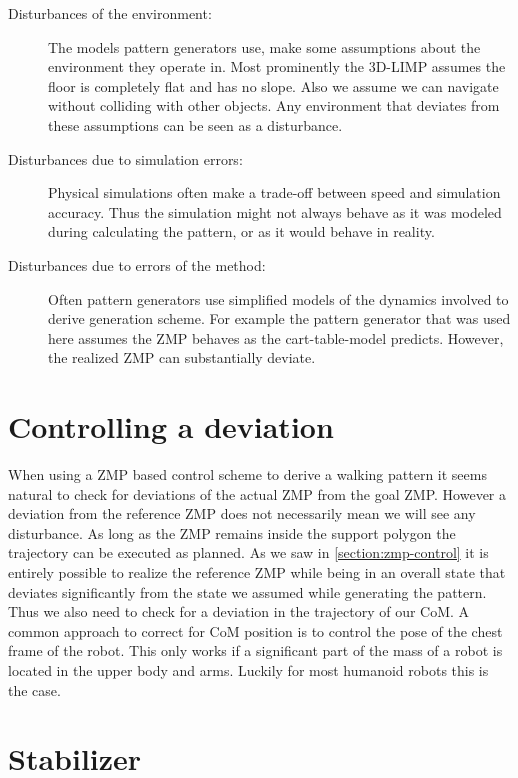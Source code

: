 \documentclass[english,ngerman]{KITreprt}
\begin{document}
\begin{description}
\item[Disturbances of the environment:]
The models pattern generators use, make some assumptions about the
environment they operate in. Most prominently the 3D-LIMP assumes the
floor is completely flat and has no slope. Also we assume we can
navigate without colliding with other objects. Any environment that
deviates from these assumptions can be seen as a disturbance.
\item[Disturbances due to simulation errors:]
Physical simulations often make a trade-off between speed and simulation
accuracy. Thus the simulation might not always behave as it was modeled
during calculating the pattern, or as it would behave in reality.
\item[Disturbances due to errors of the method:]
Often pattern generators use simplified models of the dynamics involved
to derive generation scheme. For example the pattern generator that was
used here assumes the ZMP behaves as the cart-table-model predicts.
However, the realized ZMP can substantially deviate.
\end{description}

\section{Controlling a deviation}\label{controlling-a-deviation}

When using a ZMP based control scheme to derive a walking pattern it
seems natural to check for deviations of the actual ZMP from the goal
ZMP. However a deviation from the reference ZMP does not necessarily
mean we will see any disturbance. As long as the ZMP remains inside the
support polygon the trajectory can be executed as planned. As we saw in
\ref{section:zmp-control} it is entirely possible to realize the
reference ZMP while being in an overall state that deviates
significantly from the state we assumed while generating the pattern.
Thus we also need to check for a deviation in the trajectory of our CoM.
A common approach to correct for CoM position is to control the pose of
the chest frame of the robot. This only works if a significant part of
the mass of a robot is located in the upper body and arms. Luckily for
most humanoid robots this is the case.

\section{Stabilizer}\label{section:stabilizer}
\end{document}
